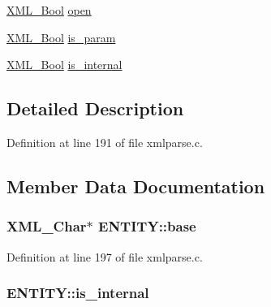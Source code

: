 \begin{DoxyCompactItemize}
\item 
\hyperlink{amiga_2include_2libraries_2expat_8h_a5fe41bca8b7a23b2405f1b967e70f33a}{X\+M\+L\+\_\+\+Bool} \hyperlink{struct_e_n_t_i_t_y_a90ce561ae568fd2edb0f959317b35c61}{open}
\item 
\hyperlink{amiga_2include_2libraries_2expat_8h_a5fe41bca8b7a23b2405f1b967e70f33a}{X\+M\+L\+\_\+\+Bool} \hyperlink{struct_e_n_t_i_t_y_a6caf2a095d9b019c96ef2864ae782936}{is\+\_\+param}
\item 
\hyperlink{amiga_2include_2libraries_2expat_8h_a5fe41bca8b7a23b2405f1b967e70f33a}{X\+M\+L\+\_\+\+Bool} \hyperlink{struct_e_n_t_i_t_y_a31c8278802c3a581735e3924f8f0235a}{is\+\_\+internal}
\end{DoxyCompactItemize}


\subsection{Detailed Description}


Definition at line 191 of file xmlparse.\+c.



\subsection{Member Data Documentation}
\subsubsection[{\texorpdfstring{base}{base}}]{ {\bf X\+M\+L\+\_\+\+Char}$\ast$ E\+N\+T\+I\+T\+Y\+::base}\hypertarget{struct_e_n_t_i_t_y_a36d7f70aa77c870be4a1e1c6f2ba62a3}{}\label{struct_e_n_t_i_t_y_a36d7f70aa77c870be4a1e1c6f2ba62a3}


Definition at line 197 of file xmlparse.\+c.

\subsubsection[{\texorpdfstring{is\+\_\+internal}{is_internal}}]{ E\+N\+T\+I\+T\+Y\+::is\+\_\+internal}\hypertarget{struct_e_n_t_i_t_y_a31c8278802c3a581735e3924f8f0235a}{}\label{struct_e_n_t_i_t_y_a31c8278802c3a581735e3924f8f0235a}


